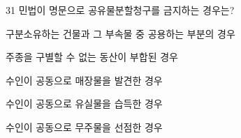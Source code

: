 \begin{question}{31}
민법이 명문으로 공유물분할청구를 금지하는 경우는?
\begin{choices}
  \item 구분소유하는 건물과 그 부속물 중 공용하는 부분의 경우
  \item 주종을 구별할 수 없는 동산이 부합된 경우
  \item 수인이 공동으로 매장물을 발견한 경우
  \item 수인이 공동으로 유실물을 습득한 경우
  \item 수인이 공동으로 무주물을 선점한 경우
\end{choices}
\end{question}

